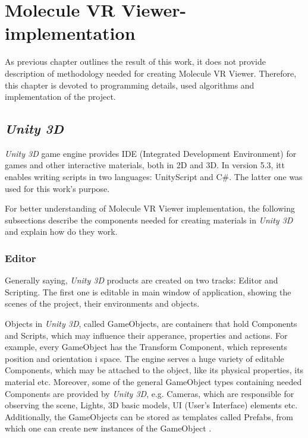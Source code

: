 
\chapter{Molecule VR Viewer- implementation}\label{chapter4}  %

As previous chapter outlines the result of this work, it does not provide description of methodology needed for creating Molecule VR Viewer. Therefore, this chapter is devoted to programming details, used algorithms and implementation of the project.

\section{\textit{Unity 3D}} %

\textit{Unity 3D} game engine provides IDE (Integrated Development Environment) for games and other interactive materials, both in 2D and 3D. In version 5.3, itt enables writing scripts in two languages: UnityScript and C\#. The latter one was used for this work's purpose.

For better understanding of Molecule VR Viewer implementation, the following subsections describe the components needed for creating  materials in \textit{Unity 3D} and explain how do they work.

\subsection{Editor}

Generally saying, \textit{Unity 3D} products are created on two tracks: Editor and Scripting. The first one is editable in main window of application, showing the scenes of the project, their environments and objects.

Objects in \textit{Unity 3D}, called GameObjects, are containers that hold Components and Scripts, which may influence their apperance, properties and actions. For example, every GameObject has the Transform Component, which represents position and orientation i space. The engine serves a huge variety of editable Components, which may be attached to the object, like its physical properties, its material etc. Moreover, some of the general GameObject types containing needed Components are provided by \textit{Unity 3D}, e.g. Cameras, which are responsible for observing the scene, Lights, 3D basic models, UI (User's Interface) elements etc. Additionally, the GameObjects can be stored as templates called Prefabs, from which one can create new instances of the GameObject \cite{Unity16}.

